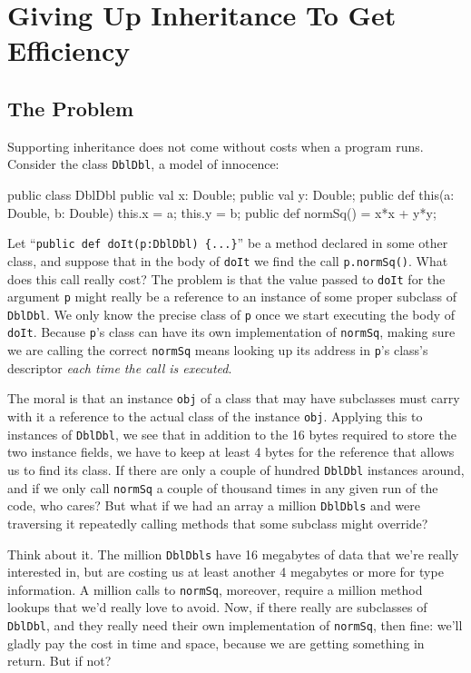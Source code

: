 \section{Giving Up Inheritance To Get Efficiency}\label{sec:guitge}
\subsection{The Problem}

Supporting inheritance does not come without costs when a program runs.
Consider the class {\tt DblDbl}, a model of innocence:

\begin{xtennum}[]
public  class DblDbl {
   public val x: Double;
   public val y: Double;
   public def this(a: Double, b: Double) {
      this.x = a; this.y = b;
   }
   public def normSq() = x*x + y*y;
}
\end{xtennum}

Let ``{\tt public def doIt(p:DblDbl) \{...\}}'' be a method declared in some
other class, and suppose that in the body of {\tt doIt}
we find the call {\tt p.normSq()}.  What does this call really cost?
The problem is that the value passed to {\tt doIt} for the argument {\tt p}
might really be a reference to an instance of some proper subclass
of {\tt DblDbl}. We only know the precise class of {\tt p} once we start
executing the body of {\tt doIt}.  Because {\tt p}'s class can have its own
implementation of {\tt normSq}, making sure we are calling the correct
{\tt normSq} means looking up its address in {\tt p}'s class's 
descriptor {\em each time the call is executed}.

The moral is that an instance {\tt obj} of a class that may have subclasses
must carry with it a reference to the actual class of the instance {\tt obj}.
Applying this to instances of {\tt DblDbl}, we see that in addition to
the 16 bytes required to store the two instance fields, we have to keep
at least 4 bytes for the reference that allows us to find its class.
If there are only a couple of hundred {\tt DblDbl} instances around, and
if we only call {\tt normSq} a couple of thousand times in any
given run of the code, who cares?  But what if we had an array a million
{\tt DblDbls} and were traversing it repeatedly calling methods that
some subclass might override?

Think about it.  The million {\tt DblDbls} have
16 megabytes of data that we're really interested in, but are costing us
at least another 4 megabytes or more for type information.  A million
calls to {\tt normSq}, moreover, require a million method lookups that
we'd really love to avoid.  Now, if
there really are subclasses of {\tt DblDbl}, and they really need their own
implementation of {\tt normSq}, then fine: we'll gladly pay the cost in time
and space, because we are getting something in return. But if not? 

